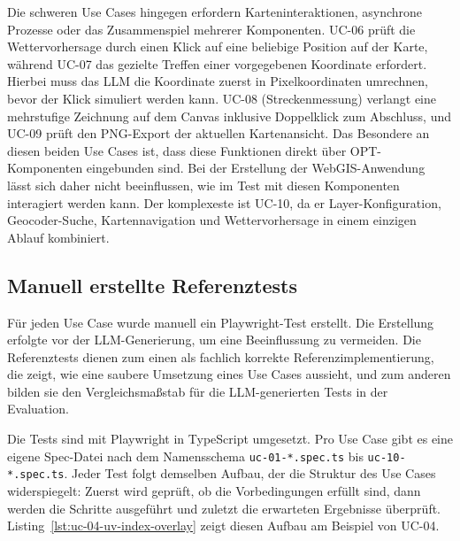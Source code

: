Die schweren Use Cases hingegen erfordern Karteninteraktionen, asynchrone Prozesse oder das Zusammenspiel mehrerer Komponenten. UC-06 prüft die Wettervorhersage durch einen Klick auf eine beliebige Position auf der Karte, während UC-07 das gezielte Treffen einer vorgegebenen Koordinate erfordert. Hierbei muss das \ac{LLM} die Koordinate zuerst in Pixelkoordinaten umrechnen, bevor der Klick simuliert werden kann. UC-08 (Streckenmessung) verlangt eine mehrstufige Zeichnung auf dem Canvas inklusive Doppelklick zum Abschluss, und UC-09 prüft den PNG-Export der aktuellen Kartenansicht. Das Besondere an diesen beiden Use Cases ist, dass diese Funktionen direkt über \ac{OPT}-Komponenten eingebunden sind. Bei der Erstellung der WebGIS-Anwendung lässt sich daher nicht beeinflussen, wie im Test mit diesen Komponenten interagiert werden kann. Der komplexeste ist UC-10, da er Layer-Konfiguration, Geocoder-Suche, Kartennavigation und Wettervorhersage in einem einzigen Ablauf kombiniert.

\subsection{Manuell erstellte Referenztests}

Für jeden Use Case wurde manuell ein Playwright-Test erstellt. Die Erstellung erfolgte vor der \ac{LLM}-Generierung, um eine Beeinflussung zu vermeiden. Die Referenztests dienen zum einen als fachlich korrekte Referenzimplementierung, die zeigt, wie eine saubere Umsetzung eines Use Cases aussieht, und zum anderen bilden sie den Vergleichsmaßstab für die LLM-generierten Tests in der Evaluation.

Die Tests sind mit Playwright in TypeScript umgesetzt. Pro Use Case gibt es eine eigene Spec-Datei nach dem Namensschema \texttt{uc-01-*.spec.ts} bis \texttt{uc-10-*.spec.ts}. Jeder Test folgt demselben Aufbau, der die Struktur des Use Cases widerspiegelt: Zuerst wird geprüft, ob die Vorbedingungen erfüllt sind, dann werden die Schritte ausgeführt und zuletzt die erwarteten Ergebnisse überprüft. Listing~\ref{lst:uc-04-uv-index-overlay} zeigt diesen Aufbau am Beispiel von UC-04.

\begin{listing}[H]
\caption{UC-04: UV-Index-Layer einblenden und prüfen, ob er auf der Karte angezeigt wird (Playwright-Test)}
\label{lst:uc-04-uv-index-overlay}
\inputminted{typescript}{Quellcode/uc-04-uv-index-overlay.spec.ts}
\end{listing}

